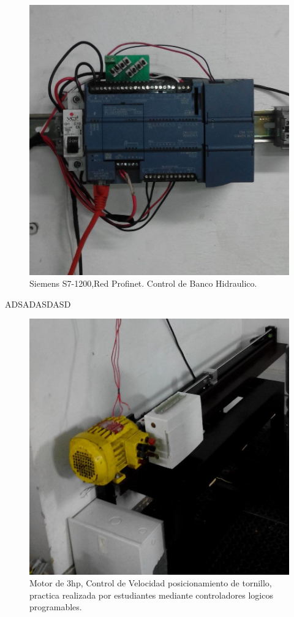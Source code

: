 \documentclass[jou,apacite]{apa6}   %
\begin{document}
\begin{figure}[htb]
\centering
\includegraphics[scale=0.2]{images/s71200.jpg}
\caption{Siemens S7-1200,Red Profinet. Control de Banco Hidraulico.} \label{fig:s7200}
\end{figure}
ADSADASDASD
\begin{figure}[htb]
\centering
\includegraphics[scale=0.2]{images/motorsimulacion.jpg}
\caption{Motor de 3hp, Control de Velocidad posicionamiento de tornillo, practica realizada por estudiantes mediante controladores logicos programables.} \label{fig:simulacion}
\end{figure}
\end{document}
